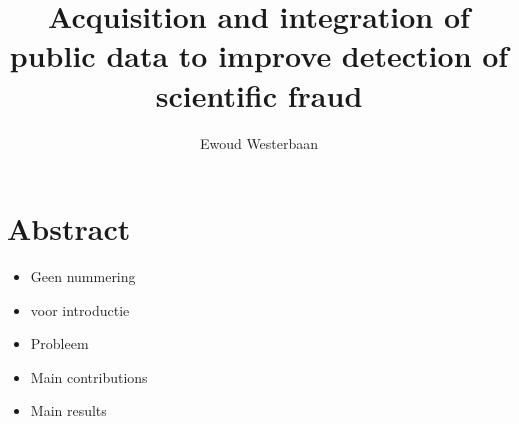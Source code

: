 \documentclass{ou-report}
\newcommand{\outline}[1]{{\color{blue} #1}}
\begin{document}
\pagestyle{plain}
\title{Acquisition and integration of public data to improve detection of scientific fraud}
\author{Ewoud Westerbaan}
%



\frontmatter 


\let\cleardoublepage\clearpage

%

%
\tableofcontents



%
%

\mainmatter
{}


\newcommand{\mi}[1]{\ensuremath{\mathit{#1}}}
\newcommand{\authors}{\mi{authors}}
\newcommand{\cites}{\mi{cites}}
\newcommand{\receives}{\mi{receives}}
\newcommand{\reviews}{\mi{reviews}}
\newcommand{\accepts}{\mi{accepts}}
\newcommand{\rejects}{\mi{rejects}}
\newcommand{\editorinchief}{\mi{EiC}}
\newcommand{\associateeditor}{\mi{AE}}
\newcommand{\Humans}{\mi{Humans}}
\newcommand{\Reviewers}{\mi{Reviewers}}
\newcommand{\Editors}{\mi{Editors}}


\chapter*{Abstract}

\outline{
\begin{itemize}
    \item Geen nummering
    \item voor introductie
    \item Probleem
    \item Main contributions
    \item Main results
\end{itemize}
}
\end{document}
